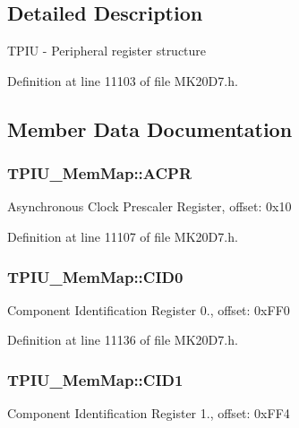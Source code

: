 \subsection{Detailed Description}
T\+P\+IU -\/ Peripheral register structure 

Definition at line 11103 of file M\+K20\+D7.\+h.



\subsection{Member Data Documentation}
\subsubsection[{\texorpdfstring{A\+C\+PR}{ACPR}}]{ T\+P\+I\+U\+\_\+\+Mem\+Map\+::\+A\+C\+PR}\hypertarget{struct_t_p_i_u___mem_map_a007e503f472f605b40c6f7425e4bdf77}{}\label{struct_t_p_i_u___mem_map_a007e503f472f605b40c6f7425e4bdf77}
Asynchronous Clock Prescaler Register, offset\+: 0x10 

Definition at line 11107 of file M\+K20\+D7.\+h.

\subsubsection[{\texorpdfstring{C\+I\+D0}{CID0}}]{ T\+P\+I\+U\+\_\+\+Mem\+Map\+::\+C\+I\+D0}\hypertarget{struct_t_p_i_u___mem_map_a396bb8a0f5c7a9494f0cd0973e8a141d}{}\label{struct_t_p_i_u___mem_map_a396bb8a0f5c7a9494f0cd0973e8a141d}
Component Identification Register 0., offset\+: 0x\+F\+F0 

Definition at line 11136 of file M\+K20\+D7.\+h.

\subsubsection[{\texorpdfstring{C\+I\+D1}{CID1}}]{ T\+P\+I\+U\+\_\+\+Mem\+Map\+::\+C\+I\+D1}\hypertarget{struct_t_p_i_u___mem_map_afa92c6c4b400339e646d717e30b505b7}{}\label{struct_t_p_i_u___mem_map_afa92c6c4b400339e646d717e30b505b7}
Component Identification Register 1., offset\+: 0x\+F\+F4 

